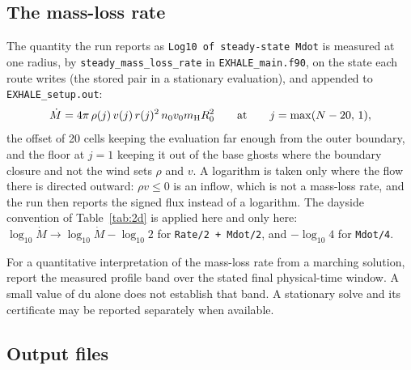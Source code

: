 \subsection{The mass-loss rate}
\label{sec:postprocessing:mdot}

The quantity the run reports as \texttt{Log10 of steady-state Mdot} is
measured at one radius, by \texttt{steady\_mass\_loss\_rate} in
\texttt{EXHALE\_main.f90}, on the state each route writes (the stored pair in
a stationary evaluation), and appended to \texttt{EXHALE\_setup.out}:
\begin{equation}
\dot M = 4\pi\,\rho(j)\,v(j)\,r(j)^{2}\,n_0v_0m_{\rm H} R_0^{2}
\qquad\text{at}\qquad j = \max(N-20,\,1),
\label{eq:pp:mdot}
\end{equation}
the offset of 20 cells keeping the evaluation far enough from the outer
boundary, and the floor at $j=1$ keeping it out of the base ghosts where the
boundary closure and not the wind sets $\rho$ and $v$. A logarithm is taken
only where the flow there is directed outward: $\rho v \le 0$ is an inflow,
which is not a mass-loss rate, and the run then reports the signed flux
instead of a logarithm. The dayside convention of Table~\ref{tab:2d} is applied here and only here:
$\log_{10}\dot M \to \log_{10}\dot M - \log_{10}2$ for
\texttt{Rate/2 + Mdot/2}, and $-\log_{10}4$ for \texttt{Mdot/4}.

For a quantitative interpretation of the mass-loss rate from a marching
solution, report the measured profile band over the stated final
physical-time window. A small value of
$\mathrm{du}$ alone does not establish that band. A stationary solve and its
certificate may be reported separately when available.

\subsection{Output files}
\label{sec:postprocessing:files}

